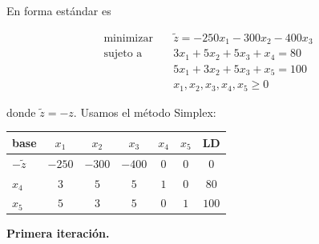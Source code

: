\documentclass[12pt]{article}
\begin{document}
En forma estándar es


\[
\begin{aligned}
\text{minimizar} \quad & \widetilde{ z }  = -250x_1 - 300x_2 - 400x_3 \\
\text{sujeto a} \quad
& 3x_1 + 5x_2 + 5x_3 + x_4 = 80 \\
& 5x_1 + 3x_2 + 5x_3 + x_5 = 100\\
& x_1,x_2,x_3,x_4,x_5 \geq 0
\end{aligned}
\]

donde $\widetilde{ z } = -z$. Usamos el método Simplex:


\begin{table}[h]

\centering

\begin{tabular}{lccccc|c}

\toprule

base & $x_1$ & $x_2$ & $x_3$ & $x_4$ & $x_5$ &  LD \\

\midrule

$-\widetilde{ z } $  & $-250$ & $-300$ & $-400$ & $0$ & $0$  & $0$ \\
\midrule
$x_4$ & $3$ & $5$  & $5$ & $1$  & $0$ & $80$ \\

$x_5$ & $5$ & $3$  & $5$ & $0$ & $1$ & $100$ \\

\bottomrule

\end{tabular}

\end{table}

\textbf{Primera iteración.} 
\end{document}
